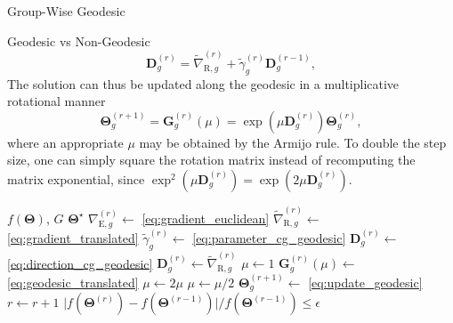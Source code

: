 \documentclass[journal]{IEEEtran}
\makeatletter
\newcommand\setalgorithmcaptionfont[1]{%
	\let\my@floatc@ruled\floatc@ruled          %
	\def\floatc@ruled{%
		\global\let\floatc@ruled\my@floatc@ruled %
		#1\floatc@ruled}}
\makeatother
\begin{document}
\begin{section}{Group-Wise Geodesic }
\begin{subsection}{Geodesic vs Non-Geodesic }
\begin{equation}
			\label{eq:parameter_cg_geodesic}
		\end{equation}
		\begin{equation}
			{\mathbf{D}}_g^{(r)} = \tilde{\nabla}_{\mathrm{R},g}^{(r)} + \tilde{\gamma}_g^{(r)} {\mathbf{D}}_g^{(r-1)},
			\label{eq:direction_cg_geodesic}
		\end{equation}
		The solution can thus be updated along the geodesic in a multiplicative rotational manner
		\begin{equation}
			\mathbf{\Theta}_g^{(r+1)} = \mathbf{G}_g^{(r)}(\mu) = \exp(\mu \mathbf{D}_g^{(r)}) \mathbf{\Theta}_g^{(r)},
			\label{eq:update_geodesic}
		\end{equation}
		where an appropriate $\mu$ may be obtained by the Armijo rule.
		To double the step size, one can simply square the rotation matrix instead of recomputing the matrix exponential, since $\exp^2(\mu \mathbf{D}_g^{(r)}) = \exp(2 \mu \mathbf{D}_g^{(r)})$.

		\setalgorithmcaptionfont{\small}
		\begin{algorithm}[!t]
			\small
			\caption{Group-wise geodesic \gls{rcg} for \gls{bd}-\gls{ris} design}
			\label{ag:rcg}
			\begin{algorithmic}[1]
				\Require $f(\mathbf{\Theta})$, $G$
				\Ensure $\mathbf{\Theta}^\star$
				\Repeat
						\State $\nabla_{\mathrm{E},g}^{(r)} \gets$ \eqref{eq:gradient_euclidean} \label{ln:gradient_euclidean}
						\State $\tilde{\nabla}_{\mathrm{R},g}^{(r)} \gets$ \eqref{eq:gradient_translated}
						\State $\tilde{\gamma}_g^{(r)} \gets$ \eqref{eq:parameter_cg_geodesic}
						\State $\mathbf{D}_g^{(r)} \gets$ \eqref{eq:direction_cg_geodesic}
						 
							\State $\mathbf{D}_g^{(r)} \gets \tilde{\nabla}_{\mathrm{R},g}^{(r)}$
						\EndIf
						\State $\mu \gets 1$
						\State $\mathbf{G}_g^{(r)}(\mu) \gets$ \eqref{eq:geodesic_translated}
						 \label{ln:armijo_start}
							\State $\mu \gets 2 \mu$
						\EndWhile
							\State $\mu \gets \mu / 2$
						\EndWhile \label{ln:armijo_end}
						\State $\mathbf{\Theta}_g^{(r+1)} \gets$ \eqref{eq:update_geodesic}
					\EndFor
					\State $r \gets r+1$
				\Until $\lvert f(\mathbf{\Theta}^{(r)}) - f(\mathbf{\Theta}^{(r-1)}) \rvert / f(\mathbf{\Theta}^{(r-1)}) \le \epsilon$
			\end{algorithmic}
		\end{algorithm}


\end{subsection}
\end{section}
\end{document}
